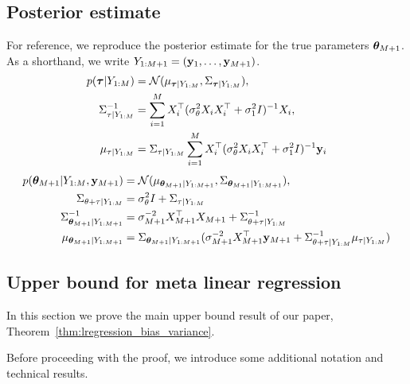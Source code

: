 \subsection{Posterior estimate}
\label{app:proofs:ubounds}

For reference, we reproduce the posterior estimate for the true parameters $\thetaY$.  As a shorthand, we write $\allData = (\by_1,\ldots, \by_{M+1})$.
\begin{align}
p(\btau \vert \sourceData) &= \mathcal{N}(\mu_{\btau \vert \sourceData}, \Sigma_{\btau \vert \sourceData}),\\
\CovPosXTau^{-1} &= \PrecPosXTauExpanded, \\
\muPosXTau &= \muPosXTauExpanded
\end{align}
\begin{align}
p(\thetaY \vert \sourceData, \novelData) &= \mathcal{N}(\muPosTheta, \CovPosTheta),\\
\CovPosXThetaTau &= \CTheta + \CovPosXTau \\
\CovPosTheta^{-1} &= \XTCYX + \CovPosXThetaTau^{-1}\\
\muPosTheta &=
\CovPosTheta (\XTCY\novelData + \CovPosXThetaTau^{-1} \muPosXTau)
\end{align}

\subsection{Upper bound for meta linear regression}

In this section we prove the main upper bound result of our paper, Theorem~\ref{thm:lregression_bias_variance}.
\mlrbv*

\noindent Before proceeding with the proof, we introduce some additional notation and technical results.

